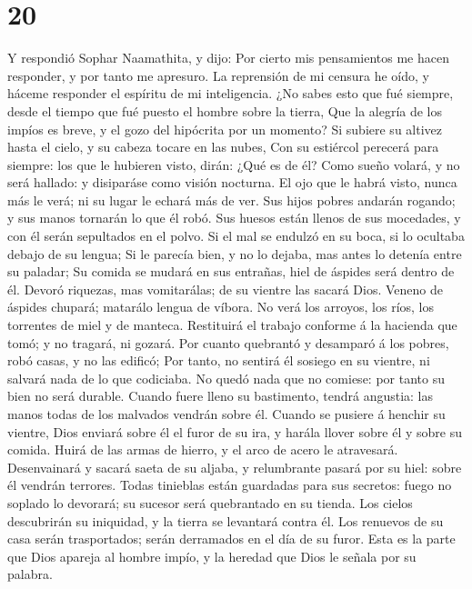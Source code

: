 \hypertarget{section-19}{%
\section{20}\label{section-19}}

 Y respondió Sophar Naamathita, y dijo:  Por
cierto mis pensamientos me hacen responder, y por tanto me apresuro.
 La reprensión de mi censura he oído, y háceme responder
el espíritu de mi inteligencia.  ¿No sabes esto que fué
siempre, desde el tiempo que fué puesto el hombre sobre la tierra,
 Que la alegría de los impíos es breve, y el gozo del
hipócrita por un momento?  Si subiere su altivez hasta el
cielo, y su cabeza tocare en las nubes,  Con su estiércol
perecerá para siempre: los que le hubieren visto, dirán: ¿Qué es de él?
 Como sueño volará, y no será hallado: y disiparáse como
visión nocturna.  El ojo que le habrá visto, nunca más le
verá; ni su lugar le echará más de ver.  Sus hijos pobres
andarán rogando; y sus manos tornarán lo que él robó. 
Sus huesos están llenos de sus mocedades, y con él serán sepultados en
el polvo.  Si el mal se endulzó en su boca, si lo
ocultaba debajo de su lengua;  Si le parecía bien, y no
lo dejaba, mas antes lo detenía entre su paladar;  Su
comida se mudará en sus entrañas, hiel de áspides será dentro de él.
 Devoró riquezas, mas vomitarálas; de su vientre las
sacará Dios.  Veneno de áspides chupará; matarálo lengua
de víbora.  No verá los arroyos, los ríos, los torrentes
de miel y de manteca.  Restituirá el trabajo conforme á
la hacienda que tomó; y no tragará, ni gozará.  Por
cuanto quebrantó y desamparó á los pobres, robó casas, y no las edificó;
 Por tanto, no sentirá él sosiego en su vientre, ni
salvará nada de lo que codiciaba.  No quedó nada que no
comiese: por tanto su bien no será durable.  Cuando fuere
lleno su bastimento, tendrá angustia: las manos todas de los malvados
vendrán sobre él.  Cuando se pusiere á henchir su
vientre, Dios enviará sobre él el furor de su ira, y harála llover sobre
él y sobre su comida.  Huirá de las armas de hierro, y el
arco de acero le atravesará.  Desenvainará y sacará saeta
de su aljaba, y relumbrante pasará por su hiel: sobre él vendrán
terrores.  Todas tinieblas están guardadas para sus
secretos: fuego no soplado lo devorará; su sucesor será quebrantado en
su tienda.  Los cielos descubrirán su iniquidad, y la
tierra se levantará contra él.  Los renuevos de su casa
serán trasportados; serán derramados en el día de su furor.
 Esta es la parte que Dios apareja al hombre impío, y la
heredad que Dios le señala por su palabra.

